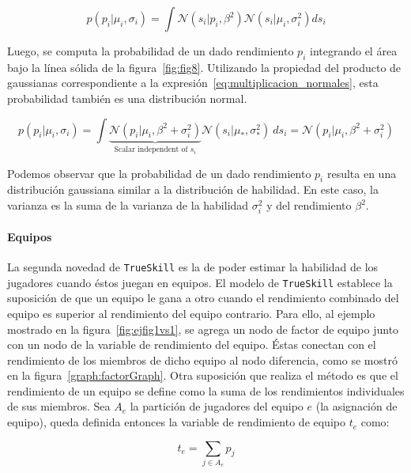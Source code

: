 \documentclass[11pt,twoside,spanish]{report} %
\begin{document}
\begin{equation}\label{eq:rend}
p(p_i|\mu_i,\sigma_i) = \int \mathcal{N}(s_i| p_i, \beta^2)\mathcal{N}(s_i|\mu_i,\sigma_i^2) ds_i
\end{equation}


Luego, se computa la probabilidad de un dado rendimiento $p_i$ integrando el \'area bajo la l\'inea s\'olida de la figura~\ref{fig:fig8}.
Utilizando la propiedad del producto de gaussianas correspondiente a la expresi\'on~\ref{eq:multiplicacion_normales}, esta probabilidad tambi\'en es una distribuci\'on normal.

\begin{equation}\label{eq:probrend}
p(p_i|\mu_i,\sigma_i) = \int \underbrace{\mathcal{N}(p_i|\mu_i,\beta^2 + \sigma_i^2)}_{\text{Scalar independent of $s_i$}} \mathcal{N}(s_i|\mu_{*},\sigma_{*}^2)  \ ds_i  = \mathcal{N}(p_i|\mu_i,\beta^2 + \sigma_i^2)
\end{equation}

Podemos observar que la probabilidad de un dado rendimiento $p_i$ resulta en una distribuci\'on gaussiana similar a la distribuci\'on de habilidad.
En este caso, la varianza es la suma de la varianza de la habilidad $\sigma_i^2$ y del rendimiento $\beta^2$.

\paragraph{Equipos}

La segunda novedad de \texttt{TrueSkill} es la de poder estimar la habilidad de los jugadores cuando \'estos juegan en equipos.
El modelo de \texttt{TrueSkill} establece la suposici\'on de que un equipo le gana a otro cuando el rendimiento combinado del equipo es superior al rendimiento del equipo contrario.
Para ello, al ejemplo mostrado en la figura~\ref{fig:ejfig1vs1}, se agrega un nodo de factor de equipo junto con un nodo de la variable de rendimiento del equipo.
\'Estas conectan con el rendimiento de los miembros de dicho equipo al nodo diferencia, como se mostr\'o en la figura~\ref{graph:factorGraph}.
Otra suposici\'on que realiza el m\'etodo es que el rendimiento de un equipo se define como la suma de los rendimientos individuales de sus miembros.
Sea $A_e$ la partici\'on de jugadores del equipo $e$ (la asignaci\'on de equipo), queda definida entonces la variable de rendimiento de equipo $t_e$ como:

\begin{equation}
t_e = \sum_{j\in A_e } p_j
\end{equation}
\end{document}
